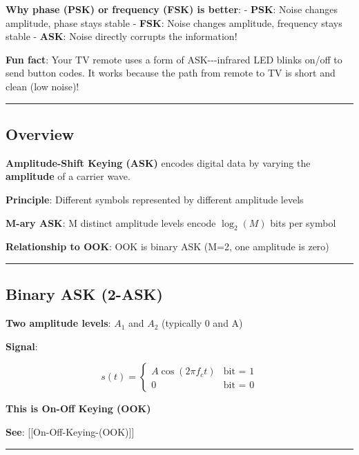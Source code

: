 \textbf{Why phase (PSK) or frequency (FSK) is better}: - \textbf{PSK}:
Noise changes amplitude, phase stays stable - \textbf{FSK}: Noise
changes amplitude, frequency stays stable - \textbf{ASK}: Noise directly
corrupts the information!

\textbf{Fun fact}: Your TV remote uses a form of ASK-\/-\/-infrared LED
blinks on/off to send button codes. It works because the path from
remote to TV is short and clean (low noise)!

\begin{center}\rule{0.5\linewidth}{0.5pt}\end{center}

\subsection{Overview}\label{overview}

\textbf{Amplitude-Shift Keying (ASK)} encodes digital data by varying
the \textbf{amplitude} of a carrier wave.

\textbf{Principle}: Different symbols represented by different amplitude
levels

\textbf{M-ary ASK}: M distinct amplitude levels encode \(\log_2(M)\)
bits per symbol

\textbf{Relationship to OOK}: OOK is binary ASK (M=2, one amplitude is
zero)

\begin{center}\rule{0.5\linewidth}{0.5pt}\end{center}

\subsection{Binary ASK (2-ASK)}\label{binary-ask-2-ask}

\textbf{Two amplitude levels}: \(A_1\) and \(A_2\) (typically 0 and A)

\textbf{Signal}:

\[
s(t) = \begin{cases}
A \cos(2\pi f_c t) & \text{bit = 1} \\
0 & \text{bit = 0}
\end{cases}
\]

\textbf{This is On-Off Keying (OOK)}

\textbf{See}: {[}{[}On-Off-Keying-(OOK){]}{]}

\begin{center}\rule{0.5\linewidth}{0.5pt}\end{center}


